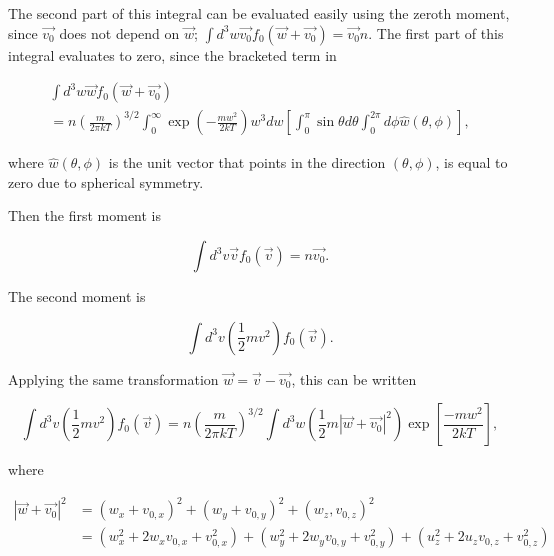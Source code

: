 \documentclass{hw-template}
\begin{document}
The second part of this integral can be evaluated easily using the zeroth moment, since $\vec{v_0}$ does not depend on $\vec{w}$; $\int d^3 w \vec{v_0} f_0 (\vec{w} + \vec{v_0}) = \vec{v_0}n$. The first part of this integral evaluates to zero, since the bracketed term in 

\begin{multline}
    \int d^3w \vec{w} f_0 (\vec{w} + \vec{v_0})  \\
    =  n{\left( \frac{m}{2\pi k T} \right)}^{3/2}\int_{0}^{\infty}    \exp \left( -\frac{m w^2}{2kT}\right)w^3 dw \left[\int_{0}^{\pi} \sin\theta d \theta \int_{0}^{2\pi}d \phi \hat{w}(\theta, \phi)\right],
\end{multline}

where $\hat{w}(\theta, \phi)$ is the unit vector that points in the direction $(\theta, \phi)$, is equal to zero due to spherical symmetry.

Then the first moment is

\begin{equation}
    \boxed{\int d^3 v \vec{v}f_0(\vec{v}) = n\vec{v_0}}.
\end{equation}

The second moment is

\begin{equation}
    \int d^3 v \left(\frac{1}{2} mv^2 \right)    f_0(\vec{v}).
\end{equation}

Applying the same transformation $\vec{w} = \vec{v} - \vec{v_0}$, this can be written


\begin{equation}
  \int d^3 v \left(\frac{1}{2} mv^2 \right)    f_0(\vec{v})= n {\left( \frac{m}{2\pi k T} \right)}^{3/2}  \int d^3 w \left(\frac{1}{2}m |\vec{w} + \vec{v_0}|^2 \right) \exp \left[ \frac{-m w^2}{2kT} \right],
\end{equation}

where

\begin{subequations}
 \begin{align}
    |\vec{w} + \vec{v_0}|^2 &= {\left(w_x + v_{0,x} \right)}^2 + {\left(w_y + v_{0,y} \right)}^2 + {\left(w_z, v_{0, z} \right)}^2\\
    &=\left(w_x^2 + 2w_x v_{0, x} + v_{0, x}^2\right) + \left(w_y^2 + 2w_y v_{0, y} + v_{0, y}^2\right) + \left(u_z^2 + 2u_z v_{0, z} + v_{0, z}^2\right)
\end{align}   
\end{subequations}
\end{document}
